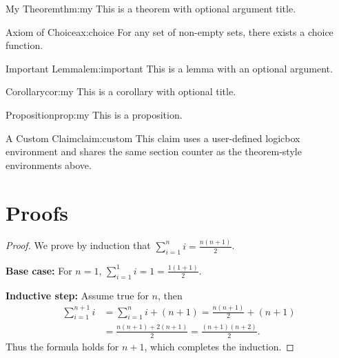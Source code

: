 \documentclass[12pt]{article}
\begin{document}
\begin{theorem}{My Theorem}{thm:my}
This is a theorem with optional argument title.
\end{theorem}

\begin{axiom}{Axiom of Choice}{ax:choice}
For any set of non-empty sets, there exists a choice function.
\end{axiom}

\begin{lemma}{Important Lemma}{lem:important}
This is a lemma with an optional argument.
\end{lemma}

\begin{corollary}{Corollary}{cor:my}
This is a corollary with optional title.
\end{corollary}

\begin{proposition}{Proposition}{prop:my}
This is a proposition.
\end{proposition}

\begin{claim}{A Custom Claim}{claim:custom}
This claim uses a user-defined logicbox environment and shares the same section
counter as the theorem-style environments above.
\end{claim}

\section{Proofs}

\begin{proof}
We prove by induction that $\sum_{i=1}^n i = \frac{n(n+1)}{2}$.

\textbf{Base case:} For $n=1$, $\sum_{i=1}^1 i = 1 = \frac{1(1+1)}{2}$.

\textbf{Inductive step:} Assume true for $n$, then
\begin{align*}
\sum_{i=1}^{n+1} i
  &= \sum_{i=1}^n i + (n+1) = \frac{n(n+1)}{2} + (n+1) \\
  &= \frac{n(n+1) + 2(n+1)}{2} = \frac{(n+1)(n+2)}{2}.
\end{align*}
Thus the formula holds for $n+1$, which completes the induction.
\end{proof}
\end{document}
